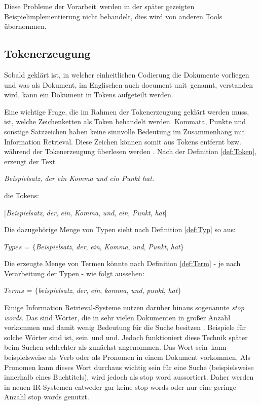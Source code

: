 Diese Probleme der \glqq Vorarbeit\grqq\ werden in der später gezeigten Beispielimplementierung nicht behandelt, dies wird von anderen Tools übernommen.

\subsection{Tokenerzeugung}\label{sub:tokenerzeugung}
Sobald geklärt ist, in welcher einheitlichen Codierung die Dokumente vorliegen und was als Dokument, im Englischen auch \glqq document unit\grqq\ genannt, verstanden wird, kann ein Dokument in Tokens aufgeteilt werden.

Eine wichtige Frage, die im Rahmen der Tokenerzeugung geklärt werden muss, ist, welche Zeichenketten als Token behandelt werden. Kommata, Punkte und sonstige Satzzeichen haben keine sinnvolle Bedeutung im Zusammenhang mit Information Retrieval. Diese Zeichen können somit aus Tokens entfernt bzw. während der Tokenerzeugung überlesen werden \cite{IR_Intro_Cambridge}. Nach der Definition \ref{def:Token}, erzeugt der Text

\begin{center}
	\textit{Beispielsatz, der ein Komma und ein Punkt hat.}
\end{center}

die Tokens:

\begin{center}
$[$\textit{Beispielsatz}, \textit{der}, \textit{ein}, \textit{Komma}, \textit{und}, \textit{ein}, \textit{Punkt}, \textit{hat}$]$
\end{center}

Die dazugehörige Menge von Typen sieht nach Definition \ref{def:Typ} so aus:

\begin{center}
	$Types$ = $\{$\textit{Beispielsatz}, \textit{der}, \textit{ein}, \textit{Komma}, \textit{und}, \textit{Punkt}, \textit{hat}$\}$
\end{center}

Die erzeugte Menge von Termen könnte nach Definition \ref{def:Term} - je nach Verarbeitung der Typen - wie folgt aussehen:

\begin{center}
	$Terms$ = $\{$\textit{beispielsatz}, \textit{der}, \textit{ein}, \textit{komma}, \textit{und}, \textit{punkt}, \textit{hat}$\}$
\end{center}

Einige Information Retrieval-Systeme nutzen darüber hinaus sogenannte \glqq\textit{stop words}\grqq . Das sind Wörter, die in sehr vielen Dokumenten in großer Anzahl vorkommen und damit wenig Bedeutung für die Suche besitzen \cite{IR_Intro_Cambridge}. Beispiele für solche Wörter sind \glqq ist\grqq, \glqq sein\grqq\ und \glqq und\grqq. Jedoch funktioniert diese Technik später beim Suchen schlechter als zunächst angenommen. Das Wort \glqq sein\grqq\ kann beispielsweise als Verb oder als Pronomen in einem Dokument vorkommen. Als Pronomen kann dieses Wort durchaus wichtig sein für eine Suche (beispielsweise innerhalb eines Buchtitels), wird jedoch als stop word aussortiert. Daher werden in neuen IR-Systemen entweder gar keine stop words oder nur eine geringe Anzahl stop words genutzt\cite[S. 27]{IR_Intro_Cambridge}.

